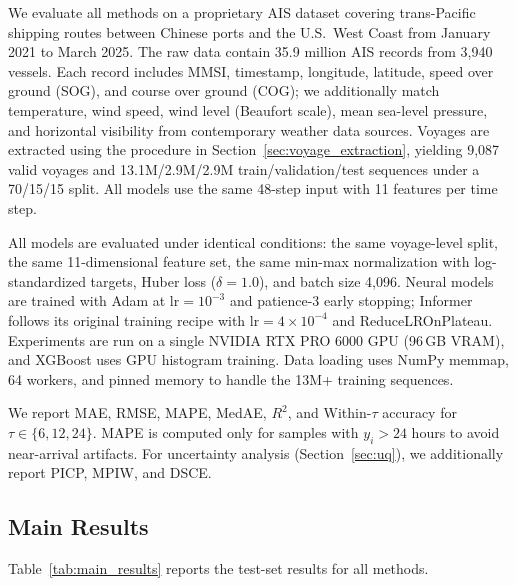 \documentclass[conference]{IEEEtran}
\begin{document}
We evaluate all methods on a proprietary AIS dataset covering trans-Pacific shipping routes between Chinese ports and the U.S.\ West Coast from January 2021 to March 2025. The raw data contain 35.9 million AIS records from 3,940 vessels. Each record includes MMSI, timestamp, longitude, latitude, speed over ground (SOG), and course over ground (COG); we additionally match temperature, wind speed, wind level (Beaufort scale), mean sea-level pressure, and horizontal visibility from contemporary weather data sources. Voyages are extracted using the procedure in Section~\ref{sec:voyage_extraction}, yielding 9,087 valid voyages and 13.1M/2.9M/2.9M train/validation/test sequences under a 70/15/15 split. All models use the same 48-step input with 11 features per time step.

All models are evaluated under identical conditions: the same voyage-level split, the same 11-dimensional feature set, the same min-max normalization with log-standardized targets, Huber loss ($\delta = 1.0$), and batch size 4,096. Neural models are trained with Adam at $\mathrm{lr}=10^{-3}$ and patience-3 early stopping; Informer follows its original training recipe with $\mathrm{lr}=4\times 10^{-4}$ and ReduceLROnPlateau. Experiments are run on a single NVIDIA RTX PRO 6000 GPU (96\,GB VRAM), and XGBoost uses GPU histogram training. Data loading uses NumPy memmap, 64 workers, and pinned memory to handle the 13M+ training sequences.

We report MAE, RMSE, MAPE, MedAE, $R^2$, and Within-$\tau$ accuracy for $\tau \in \{6,12,24\}$. MAPE is computed only for samples with $y_i > 24$ hours to avoid near-arrival artifacts. For uncertainty analysis (Section~\ref{sec:uq}), we additionally report PICP, MPIW, and DSCE.


\subsection{Main Results}

Table~\ref{tab:main_results} reports the test-set results for all methods.
\end{document}
